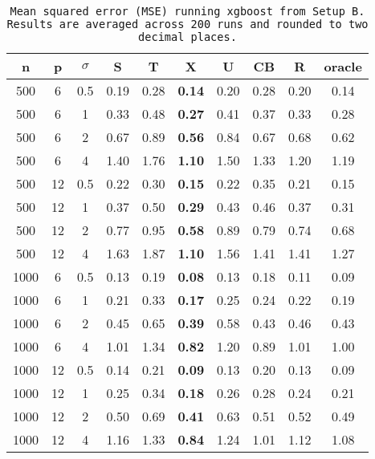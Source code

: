 \begin{table}[ht]
\centering
\begin{tabular}{cccccccccc}
  \hline
n & p & $\sigma$ & S & T & X & U & CB & R & oracle \\ 
  \hline
500 & 6 & 0.5 & 0.19 & 0.28 & \bf 0.14 & 0.20 & 0.28 & 0.20 & 0.14 \\ 
  500 & 6 & 1 & 0.33 & 0.48 & \bf 0.27 & 0.41 & 0.37 & 0.33 & 0.28 \\ 
  500 & 6 & 2 & 0.67 & 0.89 & \bf 0.56 & 0.84 & 0.67 & 0.68 & 0.62 \\ 
  500 & 6 & 4 & 1.40 & 1.76 & \bf 1.10 & 1.50 & 1.33 & 1.20 & 1.19 \\ 
  500 & 12 & 0.5 & 0.22 & 0.30 & \bf 0.15 & 0.22 & 0.35 & 0.21 & 0.15 \\ 
  500 & 12 & 1 & 0.37 & 0.50 & \bf 0.29 & 0.43 & 0.46 & 0.37 & 0.31 \\ 
  500 & 12 & 2 & 0.77 & 0.95 & \bf 0.58 & 0.89 & 0.79 & 0.74 & 0.68 \\ 
  500 & 12 & 4 & 1.63 & 1.87 & \bf 1.10 & 1.56 & 1.41 & 1.41 & 1.27 \\ 
  1000 & 6 & 0.5 & 0.13 & 0.19 & \bf 0.08 & 0.13 & 0.18 & 0.11 & 0.09 \\ 
  1000 & 6 & 1 & 0.21 & 0.33 & \bf 0.17 & 0.25 & 0.24 & 0.22 & 0.19 \\ 
  1000 & 6 & 2 & 0.45 & 0.65 & \bf 0.39 & 0.58 & 0.43 & 0.46 & 0.43 \\ 
  1000 & 6 & 4 & 1.01 & 1.34 & \bf 0.82 & 1.20 & 0.89 & 1.01 & 1.00 \\ 
  1000 & 12 & 0.5 & 0.14 & 0.21 & \bf 0.09 & 0.13 & 0.20 & 0.13 & 0.09 \\ 
  1000 & 12 & 1 & 0.25 & 0.34 & \bf 0.18 & 0.26 & 0.28 & 0.24 & 0.21 \\ 
  1000 & 12 & 2 & 0.50 & 0.69 & \bf 0.41 & 0.63 & 0.51 & 0.52 & 0.49 \\ 
  1000 & 12 & 4 & 1.16 & 1.33 & \bf 0.84 & 1.24 & 1.01 & 1.12 & 1.08 \\ 
   \hline
\end{tabular}
\caption{\tt Mean squared error (MSE) running \texttt{xgboost} from Setup B. Results are averaged across 200 runs and rounded to two decimal places.} 
\label{table:setup2}
\end{table}
